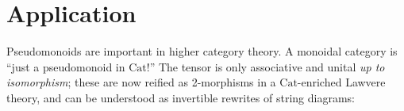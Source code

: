 \documentclass[a4paper,UKenglish]{article}
\theoremstyle{definition}
\newcommand{\Cat}{\mathrm{Cat}}
\begin{document}
\section{Application}
Pseudomonoids \cite{pseudo} are important in higher category theory. A monoidal category is ``just a pseudomonoid in $\Cat$!'' The tensor is only associative and unital \textit{up to isomorphism}; these are now reified as 2-morphisms in a $\Cat$-enriched Lawvere theory, and can be understood as invertible rewrites of string diagrams:

\begin{center}
\\~\\
\\
\qquad
\begin{minipage}{.2 \textwidth}
\end{minipage}\qquad
{}\\

\qquad
\begin{minipage}{.2 \textwidth}
\end{minipage}\qquad
{}
\end{center}
\end{document}
